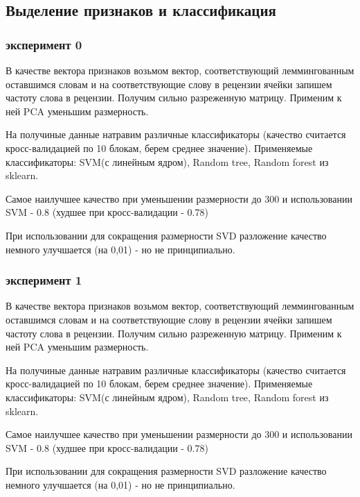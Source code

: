 \documentclass[]{report}
\begin{document}
\subsection{Выделение признаков и классификация}
\subsubsection{эксперимент 0}
В качестве вектора признаков возьмом вектор, соответствующий леммингованным оставшимся словам и на соответствующие слову в рецензии ячейки запишем частоту слова в рецензии. Получим сильно разреженную матрицу.
Применим к ней PCA уменьшим размерность.

На получиные данные натравим различные классификаторы (качество считается кросс-валидацией по 10 блокам, берем среднее значение).
Применяемые классификаторы: SVM(с линейным ядром), Random tree, Random forest из sklearn.

Самое наилучшее качество при уменьшении размерности до 300 и использовании SVM - 0.8 (худшее при кросс-валидации - 0.78)

При использовании для сокращения размерности SVD разложение качество немного улучшается (на 0,01) - но не принципиально.

\subsubsection{эксперимент 1}
В качестве вектора признаков возьмом вектор, соответствующий леммингованным оставшимся словам и на соответствующие слову в рецензии ячейки запишем частоту слова в рецензии. Получим сильно разреженную матрицу.
Применим к ней PCA уменьшим размерность.

На получиные данные натравим различные классификаторы (качество считается кросс-валидацией по 10 блокам, берем среднее значение).
Применяемые классификаторы: SVM(с линейным ядром), Random tree, Random forest из sklearn.

Самое наилучшее качество при уменьшении размерности до 300 и использовании SVM - 0.8 (худшее при кросс-валидации - 0.78)

При использовании для сокращения размерности SVD разложение качество немного улучшается (на 0,01) - но не принципиально.
\end{document}

